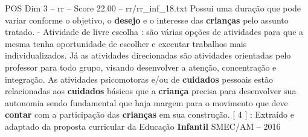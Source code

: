 \begin{textsample}{POS Dim 3 – rr – Score 22.00 – rr/rr\_inf\_18.txt}
Possui uma duração que pode variar conforme o objetivo, o \textbf{desejo} e o interesse das \textbf{crianças} pelo assunto tratado. - Atividade de livre escolha : são várias opções de atividades para que a mesma tenha oportunidade de escolher e executar trabalhos mais individualizados.
Já as atividades direcionadas são atividades orientadas pelo professor para todo grupo, visando desenvolver a atenção, concentração e integração.
As atividades psicomotoras e/ou de \textbf{cuidados} pessoais estão relacionadas aos \textbf{cuidados} básicos que a \textbf{criança} precisa para desenvolver sua autonomia sendo fundamental que haja margem para o movimento que deve \textbf{contar} com a participação das \textbf{crianças} em sua construção. [ 4 ] : Extraído e adaptado da proposta curricular da Educação \textbf{Infantil} SMEC/AM – 2016

\end{textsample}
